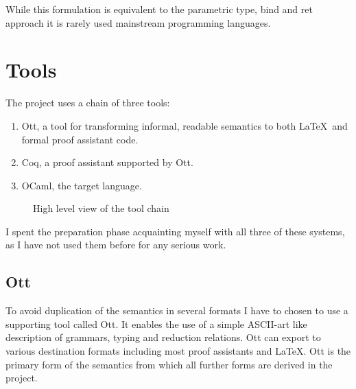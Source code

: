 \documentclass[12pt,twoside,notitlepage]{report}
\begin{document}
While this formulation is equivalent to the parametric type, bind and ret approach it is rarely used mainstream programming languages.

\section{Tools}
The project uses a chain of three tools: \begin{enumerate}
\item{
Ott, a tool for transforming informal, readable semantics to both \LaTeX\, and formal proof assistant code.}
\item{Coq, a proof assistant supported by Ott. }
\item{OCaml, the target language. }
\end{enumerate}



\begin{figure}[h!]
\centering

\caption{High level view of the tool chain}
\end{figure}


I spent the preparation phase acquainting myself with all three of these systems, as I have not used them before for any serious work.
\subsection{Ott}
To avoid duplication of the semantics in several formats I have to chosen to use a supporting tool called Ott\cite{Ott}. It enables the use of a simple ASCII-art like description of grammars, typing and reduction relations. Ott can export to various destination formats including most proof assistants and \LaTeX. Ott  is the primary form of the semantics from which all further forms are derived in the project.
\end{document}
